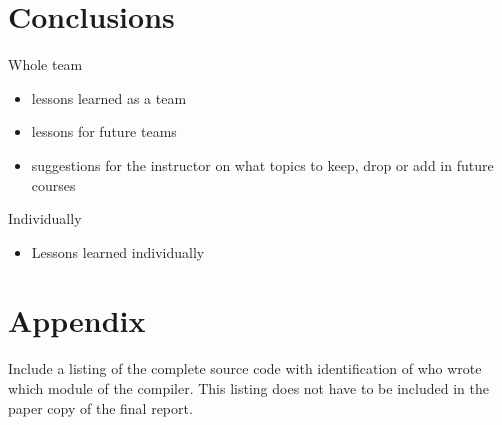 \documentclass[11pt]{article}
\begin{document}
\section{Conclusions}
Whole team
\begin{itemize}
\item lessons learned as a team
\item lessons for future teams
\item suggestions for the instructor on what topics to keep, drop or add in future courses
\end{itemize}
Individually
\begin{itemize}
\item Lessons learned individually
\end{itemize}

\section{Appendix}
Include a listing of the complete source code with identification of who wrote which module of the compiler. This listing does not have to be included in the paper copy of the final report.
\end{document}
